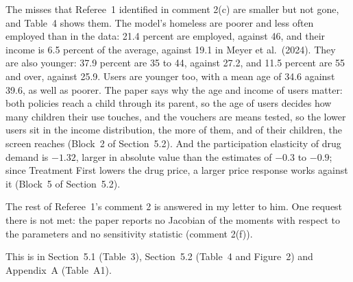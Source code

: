 \documentclass[11pt]{article}
\begin{document}
\begin{response}
The misses that Referee~1 identified in comment 2(c) are smaller but not gone, and
Table~4 shows them. The model's homeless are poorer and less often employed than in
the data: 21.4 percent are employed, against 46, and their income is 6.5 percent of
the average, against 19.1 in Meyer et al.\ (2024). They are also younger: 37.9
percent are 35 to 44, against 27.2, and 11.5 percent are 55 and over, against 25.9.
Users are younger too, with a mean age of 34.6 against 39.6, as well as poorer. The
paper says why the age and income of users matter: both policies reach a child
through its parent, so the age of users decides how many children their use
touches, and the vouchers are means tested, so the lower users sit in the income
distribution, the more of them, and of their children, the screen reaches (Block~2
of Section~5.2). And the participation elasticity of drug demand is $-1.32$, larger
in absolute value than the estimates of $-0.3$ to $-0.9$; since Treatment First
lowers the drug price, a larger price response works against it (Block~5 of
Section~5.2).

\open The rest of Referee~1's comment 2 is answered in my letter to him. One request
there is not met: the paper reports no Jacobian of the moments with respect to the
parameters and no sensitivity statistic (comment 2(f)).

This is in Section~5.1 (Table~3), Section~5.2 (Table~4 and Figure~2) and
Appendix~A (Table~A1).
\end{response}
\end{document}
